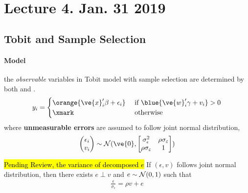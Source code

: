 \documentclass[11pt]{article}
\begin{document}
	\section{Lecture 4. Jan. 31 2019}
		\subsection{Tobit and Sample Selection}
			\paragraph{Model} the \emph{observable} variables in Tobit model with sample selection are determined by both  and .
			\begin{gather}
				y_i = \begin{cases}
					\orange{\ve{x}_i' \beta + \epsilon_i} &\tx{ if } \blue{\ve{w}_i' \gamma + v_i} > 0 \\
					$\xmark$ &\tx{ otherwise}
				\end{cases}
			\end{gather}
			where \textbf{unmeasurable errors} are assumed to follow joint normal distribution,
			\begin{gather}
				\begin{pmatrix}
					\epsilon_i \\ v_i	
				\end{pmatrix}
				\sim \mc{N}(\ve{0},
				\begin{bmatrix}
					\sigma_{\epsilon}^2 & \rho \sigma_\varepsilon \\
					\rho \sigma_\varepsilon & 1
				\end{bmatrix})
			\end{gather}
			
			\begin{lemma}
				\hl{Pending Review, the variance of decomposed $e$} If $(\epsilon, v)$ follows joint normal distribution, then there exists $e \perp v$ and $e \sim \mathcal{{N}}(0,1)$ such that
				\begin{gather}
					\frac{\epsilon}{\sigma_{\epsilon}} = \rho v + e
				\end{gather}
			\end{lemma}
\end{document}
